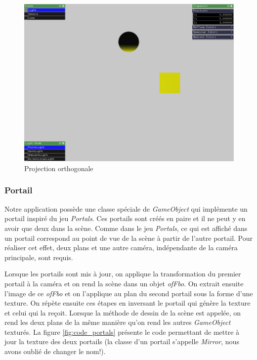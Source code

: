 \begin{figure}[H]
    \centering
	\includegraphics[scale=0.25]{fig/orthogonale.png}
	\caption{Projection orthogonale}
	\label{fig:orthogonale}
\end{figure}


\subsubsection{Portail}
\label{s:portail}
Notre application possède une classe spéciale de \emph{GameObject} qui implémente un portail inspiré du jeu \emph{Portals}.
Ces portails sont créés en paire et il ne peut y en avoir que deux dans la scène.
Comme dans le jeu \emph{Portals}, ce qui est affiché dans un portail correspond au point de vue de la scène à partir de l'autre portail.
Pour réaliser cet effet, deux plans et une autre caméra, indépendante de la caméra principale, sont requis.

Lorsque les portails sont mis à jour, on applique la transformation du premier portail à la caméra et on rend la scène dans un objet \emph{ofFbo}.
On extrait ensuite l'image de ce \emph{ofFbo} et on l'applique au plan du second portail sous la forme d'une texture.
On répète ensuite ces étapes en inversant le portail qui génère la texture et celui qui la reçoit.
Lorsque la méthode de dessin de la scène est appelée, on rend les deux plans de la même manière qu'on rend les autres \emph{GameObject} texturés.
La figure \ref{fig:code_portals} présente le code permettant de mettre à jour la texture des deux portails (la classe d'un portail s'appelle \emph{Mirror}, nous avons oublié de changer le nom!).

